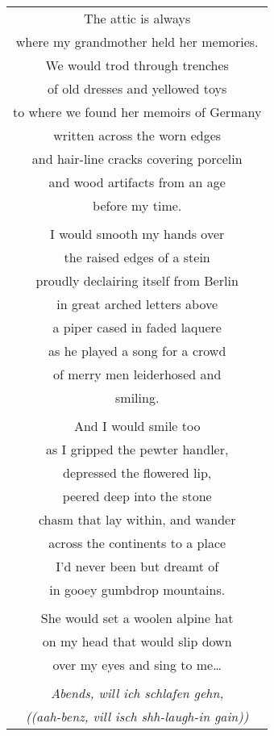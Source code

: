 \documentclass{article}
\begin{document}
\begin{center}
\begin{tabular}{c}
\\
The attic is always \\
where my grandmother held her memories. \\
We would trod through trenches \\
of old dresses and yellowed toys \\
to where we found her memoirs of Germany \\
written across the worn edges \\
and hair-line cracks covering porcelin \\
and wood artifacts from an age \\
before my time. \\
\\
I would smooth my hands over \\
the raised edges of a stein \\
proudly declairing itself from Berlin \\
in great arched letters above \\
a piper cased in faded laquere \\
as he played a song for a crowd \\
of merry men leiderhosed and \\
smiling. \\
\\
And I would smile too \\
as I gripped the pewter handler, \\
depressed the flowered lip, \\
peered deep into the stone \\
chasm that lay within, and wander \\
across the continents to a place \\
I'd never been but dreamt of \\
in gooey gumbdrop mountains. \\
\\
She would set a woolen alpine hat \\
on my head that would slip down \\
over my eyes and sing to me\ldots{} \\
\\
\textit{Abends, will ich schlafen gehn,} \\
{\scriptsize\textit{((aah-benz, vill isch shh-laugh-in gain))}} \\

\end{tabular}
\end{center}
\end{document}
